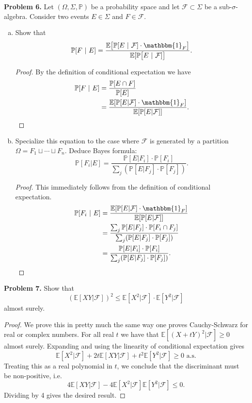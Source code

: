 \documentclass[11pt,letterpaper]{report}
\newcommand{\mcal}[1]{\mathcal{#1}}
\newcommand{\E}{\mathbb{E}}
\newcommand{\Prob}{\mathbb{P}}
\newcommand{\ind}{\mathbbm{1}}
\begin{document}
\noindent\textbf{Problem 6. }
Let $(\Omega, \Sigma, \Prob)$ be a probability space and let $\mcal{F}\subset \Sigma$ be a sub-$\sigma$-algebra. Consider two events $E\in \Sigma$ and $F\in \mcal{F}$.
\begin{enumerate}[(a)]
	\item Show that
	\[
	\Prob[F\ |\ E] = \frac{\E\big[\Prob[E\ |\ \mcal{F}]\cdot\ind_F\big]}{\E[\Prob\big[E\ |\ \mcal{F}]\big]}.
	\]
	\begin{proof}
		By the definition of conditional expectation we have
		\begin{align*}
			\Prob[F\ |\ E] &= \frac{\Prob[E\cap F]}{\Prob[E]}\\
			&= \frac{\E[\Prob[E|\mcal{F}]\cdot \ind_F]}{\E[\Prob[E|\mcal{F}]]}.
		\end{align*}
	\end{proof}

	\item Specialize this equation to the case where $\mcal{F}$ is generated by a partition $\Omega = F_1 \sqcup \cdots \sqcup F_n$. Deduce Bayes formula:
	\[
	\Prob[F_i|E] = \frac{\Prob[E|F_i]\cdot\Prob[F_i]}{\sum_j(\Prob[E|F_j]\cdot\Prob[F_j])}.
	\]
	\begin{proof}
		This immediately follows from the definition of conditional expectation.
		\begin{align*}
			\Prob[F_i\ |\ E] &= \frac{\E[\Prob[E|\mcal{F}]\cdot \ind_F]}{\E[\Prob[E|\mcal{F}]]}\\
			&= \frac{\sum_j \Prob[E|F_j]\cdot \Prob[F_i\cap F_j]}{\sum_j(\Prob[E|F_j]\cdot \Prob[F_j])}\\
			&= \frac{\Prob[E|F_i]\cdot\Prob[F_i]}{\sum_j(\Prob[E|F_j]\cdot\Prob[F_j])}.
		\end{align*}
	\end{proof}
\end{enumerate}

\noindent\textbf{Problem 7. }
Show that
\[
(\E[XY|\mcal{F}])^2 \leq \E[X^2|\mcal{F}]\cdot \E[Y^2|\mcal{F}]
\]
almost surely.
\begin{proof}
	We prove this in pretty much the same way one proves Cauchy-Schwarz for real or complex numbers. For all real $t$ we have that $\E[(X+tY)^2|\mcal{F}]\geq 0$ almost surely. Expanding and using the linearity of conditional expectation gives
	\[
	\E[X^2|\mcal{F}] + 2t\E[XY|\mcal{F}] + t^2\E[Y^2|\mcal{F}] \geq 0\text{ a.s.}
	\]
	Treating this as a real polynomial in $t$, we conclude that the discriminant must be non-positive, i.e.
	\[
	4\E[XY|\mcal{F}]-4\E[X^2|\mcal{F}]\E[Y^2|\mcal{F}] \leq 0.
	\]
	Dividing by 4 gives the desired result.
\end{proof}
\end{document}
